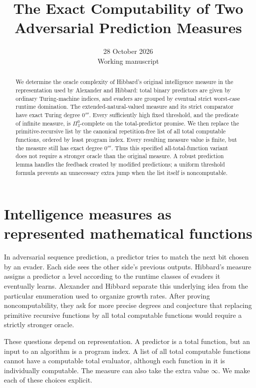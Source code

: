 \documentclass[11pt]{article}
\title{The Exact Computability of Two\\Adversarial Prediction Measures}
\author{}
\date{28 October 2026\\Working manuscript}
\begin{document}
\maketitle
\begin{abstract}
We determine the oracle complexity of Hibbard's original intelligence
measure in the representation used by Alexander and Hibbard: total
binary predictors are given by ordinary Turing-machine indices, and
evaders are grouped by eventual strict worst-case runtime domination.
The extended-natural-valued measure and its strict comparator have
exact Turing degree $0'''$. Every sufficiently high fixed threshold,
and the predicate of infinite measure, is $\Pi^0_3$-complete on the
total-predictor promise. We then replace the primitive-recursive list
by the canonical repetition-free list of all total computable functions,
ordered by least program index. Every resulting measure value is finite,
but the measure still has exact degree $0'''$. Thus this specified
all-total-function variant does not require a stronger oracle than
the original measure. A robust prediction lemma handles the feedback
created by modified predictions; a uniform threshold formula prevents
an unnecessary extra jump when the list itself is noncomputable.
\end{abstract}
\tableofcontents

\section{Intelligence measures as represented mathematical functions}

In adversarial sequence prediction, a predictor tries to match the
next bit chosen by an evader. Each side sees the other side's previous
outputs. Hibbard's measure assigns a predictor a level according to
the runtime classes of evaders it eventually learns. Alexander and
Hibbard \cite{AH} separate this underlying idea from the particular
enumeration used to organize growth rates. After proving
noncomputability, they ask for more precise degrees and conjecture
that replacing primitive recursive functions by all total computable
functions would require a strictly stronger oracle.

These questions depend on representation. A predictor is a total
function, but an input to an algorithm is a program index. A list
of all total computable functions cannot have a computable total
evaluator, although each function in it is individually computable.
The measure can also take the extra value $\infty$. We make each of
these choices explicit.
\end{document}
